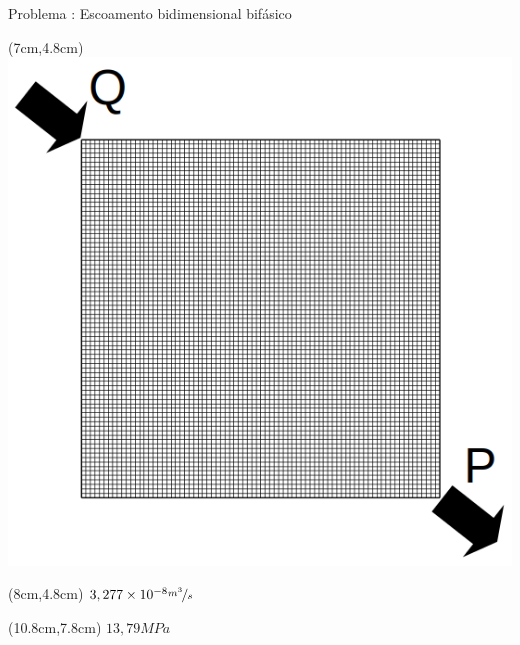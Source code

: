 \documentclass[professionalfont]{beamer}
\begin{document}
\begin{frame}{Problema \theproblem: Escoamento bidimensional bifásico}
    \begin{textblock*}{6cm}(7cm,4.8cm)
        \includegraphics[scale=0.2]{./imgs/prescricao.png}

    \end{textblock*}

    \begin{textblock*}{6cm}(8cm,4.8cm)
        \footnotesize
        $ 3,277 \times 10^{-8} \nicefrac{m^{3}}{s}$

    \end{textblock*}

    \begin{textblock*}{6cm}(10.8cm,7.8cm)
        \footnotesize
        $13,79MPa$

    \end{textblock*}



    
\end{frame}
\end{document}
